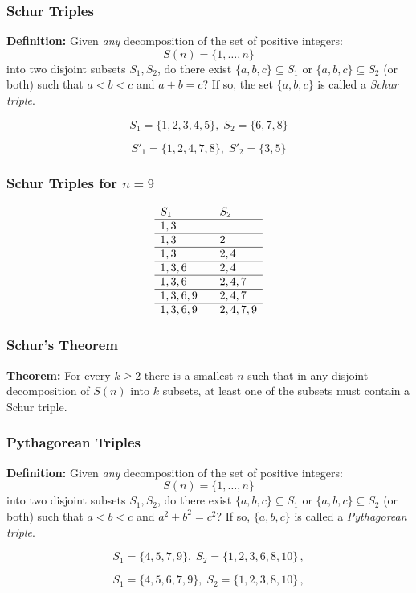 \documentclass{beamer}
\begin{document}

\begin{frame}
\frametitle{Schur Triples}

\textbf{Definition:}
Given \emph{any} decomposition of the set of positive integers:
\[
S(n)=\{1,\ldots,n\}
\]
into two disjoint subsets $S_1,S_2$, do there exist $\{a,b,c\}\subseteq S_1$ or $\{a,b,c\}\subseteq S_2$ (or both) such that $a\!<\!b\!<\!c$ and $a+b=c$? If so, the set $\{a,b,c\}$ is called a \emph{Schur triple}.

\pause

\[
S_1 = \{1,2,3,4,5\},\; S_2 = \{6,7,8\}
\]

\pause

\[
S'_1 = \{1,2,4,7,8\},\; S'_2 = \{3,5\}
\]
\end{frame}

\begin{frame}
\frametitle{Schur Triples for $n=9$}
\[
\begin{array}{l@{\hspace{2em}}l}
S_1&S_2\\\hline
1,3 & \\\hline
1,3 & 2\\\hline
1,3 & 2,4\\\hline
1,3,6 & 2,4\\\hline
1,3,6 & 2,4,7\\\hline
1,3,6,9 & 2,4,7\\\hline
1,3,6,9 & 2,4,7,9
\end{array}
\]

\end{frame}

\begin{frame}
\frametitle{Schur's Theorem}
\textbf{Theorem:}
For every $k\geq 2$ there is a smallest $n$ such that in any disjoint decomposition of $S(n)$ into $k$ subsets, at least one of the subsets must contain a Schur triple.
\end{frame}


\begin{frame}
\frametitle{Pythagorean Triples}

\textbf{Definition:}
Given \emph{any} decomposition of the set of positive integers:
\[
S(n)=\{1,\ldots,n\}
\]
into two disjoint subsets $S_1,S_2$, do there exist $\{a,b,c\}\subseteq S_1$ or $\{a,b,c\}\subseteq S_2$ (or both) such that $a\!<\!b\!<\!c$ and $a^2+b^2=c^2$? If so, $\{a,b,c\}$ is called a \emph{Pythagorean triple}.

\pause
\[
S_1 = \{4,5,7,9\},\; S_2=\{1,2,3,6,8,10\}\,,
\]

\pause
\[
S_1 = \{4,5,6,7,9\},\; S_2=\{1,2,3,8,10\}\,,
\]
\end{frame}
\end{document}
